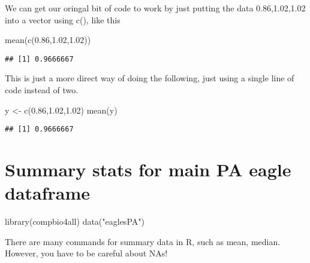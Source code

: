 \documentclass[
]{book}
\newenvironment{Shaded}{\begin{snugshade}}{\end{snugshade}}
\newcommand{\FloatTok}[1]{\textcolor[rgb]{0.00,0.00,0.81}{#1}}
\newcommand{\FunctionTok}[1]{\textcolor[rgb]{0.00,0.00,0.00}{#1}}
\newcommand{\NormalTok}[1]{#1}
\newcommand{\OtherTok}[1]{\textcolor[rgb]{0.56,0.35,0.01}{#1}}
\newcommand{\SpecialCharTok}[1]{\textcolor[rgb]{0.00,0.00,0.00}{#1}}
\newcommand{\StringTok}[1]{\textcolor[rgb]{0.31,0.60,0.02}{#1}}
\begin{document}
We can get our oringal bit of code to work by just putting the data 0.86,1.02,1.02 into a vector using c(), like this

\begin{Shaded}
\begin{Highlighting}[]
\FunctionTok{mean}\NormalTok{(}\FunctionTok{c}\NormalTok{(}\FloatTok{0.86}\NormalTok{,}\FloatTok{1.02}\NormalTok{,}\FloatTok{1.02}\NormalTok{))}
\end{Highlighting}
\end{Shaded}

\begin{verbatim}
## [1] 0.9666667
\end{verbatim}

This is just a more direct way of doing the following, just using a single line of code instead of two.

\begin{Shaded}
\begin{Highlighting}[]
\NormalTok{y }\OtherTok{\textless{}{-}} \FunctionTok{c}\NormalTok{(}\FloatTok{0.86}\NormalTok{,}\FloatTok{1.02}\NormalTok{,}\FloatTok{1.02}\NormalTok{)}
\FunctionTok{mean}\NormalTok{(y)}
\end{Highlighting}
\end{Shaded}

\begin{verbatim}
## [1] 0.9666667
\end{verbatim}

\hypertarget{summary-stats-for-main-pa-eagle-dataframe}{%
\chapter{Summary stats for main PA eagle dataframe}\label{summary-stats-for-main-pa-eagle-dataframe}}

\begin{Shaded}
\begin{Highlighting}[]
\FunctionTok{library}\NormalTok{(compbio4all)}
\FunctionTok{data}\NormalTok{(}\StringTok{"eaglesPA"}\NormalTok{)}
\end{Highlighting}
\end{Shaded}

There are many commands for summary data in R, such as mean, median. However, you have to be careful about NAs!

\begin{Shaded}
\end{Shaded}
\end{document}
